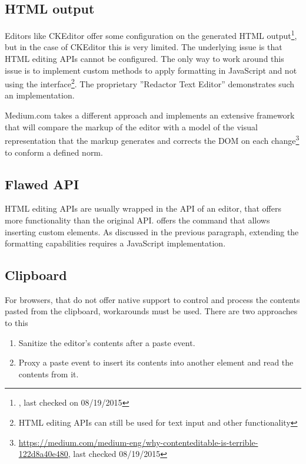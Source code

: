 \subsection{HTML output} 
\label{subsec:treating_issues_first}

Editors like CKEditor offer some configuration on the generated HTML output\footnote{\begin{sloppypar}, last checked on 08/19/2015\end{sloppypar}}, but in the case of CKEditor this is very limited. The underlying issue is that HTML editing APIs cannot be configured. The only way to work around this issue is to implement custom methods to apply formatting in JavaScript and not using the  interface\footnote{HTML editing APIs can still be used for text input and other functionality}. The proprietary ''Redactor Text Editor'' demonstrates such an implementation.

Medium.com takes a different approach and implements an extensive framework that will compare the markup of the editor with a model of the visual representation that the markup generates and corrects the DOM on each change\footnote{\url{https://medium.com/medium-eng/why-contenteditable-is-terrible-122d8a40e480}, last checked 08/19/2015} to conform a defined norm.

\subsection{Flawed API}

HTML editing APIs are usually wrapped in the API of an editor, that offers more functionality than the original API.  offers the  command that allows inserting custom elements. As discussed in the previous paragraph, extending the formatting capabilities requires a JavaScript implementation.

\subsection{Clipboard}

For browsers, that do not offer native support to control and process the contents pasted from the clipboard, workarounds must be used. There are two approaches to this

\begin{enumerate}
\item Sanitize the editor's contents after a paste event.
\item Proxy a paste event to insert its contents into another element and read the contents from it.
\end{enumerate}

